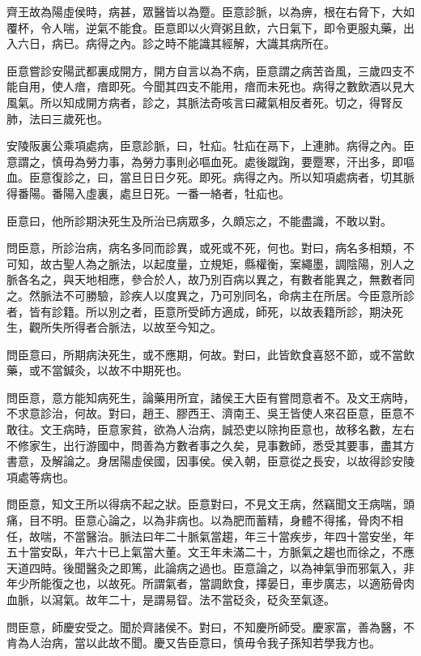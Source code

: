 齊王故為陽虛侯時，病甚，眾醫皆以為蹷。臣意診脈，以為痹，根在右脅下，大如覆杯，令人喘，逆氣不能食。臣意即以火齊粥且飲，六日氣下，即令更服丸藥，出入六日，病已。病得之內。診之時不能識其經解，大識其病所在。

臣意嘗診安陽武都裏成開方，開方自言以為不病，臣意謂之病苦沓風，三歲四支不能自用，使人瘖，瘖即死。今聞其四支不能用，瘖而未死也。病得之數飲酒以見大風氣。所以知成開方病者，診之，其脈法奇咳言曰藏氣相反者死。切之，得腎反肺，法曰三歲死也。

安陵阪裏公乘項處病，臣意診脈，曰，牡疝。牡疝在鬲下，上連肺。病得之內。臣意謂之，慎毋為勞力事，為勞力事則必嘔血死。處後蹴踘，要蹷寒，汗出多，即嘔血。臣意復診之，曰，當旦日日夕死。即死。病得之內。所以知項處病者，切其脈得番陽。番陽入虛裏，處旦日死。一番一絡者，牡疝也。

臣意曰，他所診期決死生及所治已病眾多，久頗忘之，不能盡識，不敢以對。

問臣意，所診治病，病名多同而診異，或死或不死，何也。對曰，病名多相類，不可知，故古聖人為之脈法，以起度量，立規矩，縣權衡，案繩墨，調陰陽，別人之脈各名之，與天地相應，參合於人，故乃別百病以異之，有數者能異之，無數者同之。然脈法不可勝驗，診疾人以度異之，乃可別同名，命病主在所居。今臣意所診者，皆有診籍。所以別之者，臣意所受師方適成，師死，以故表籍所診，期決死生，觀所失所得者合脈法，以故至今知之。

問臣意曰，所期病決死生，或不應期，何故。對曰，此皆飲食喜怒不節，或不當飲藥，或不當鍼灸，以故不中期死也。

問臣意，意方能知病死生，論藥用所宜，諸侯王大臣有嘗問意者不。及文王病時，不求意診治，何故。對曰，趙王、膠西王、濟南王、吳王皆使人來召臣意，臣意不敢往。文王病時，臣意家貧，欲為人治病，誠恐吏以除拘臣意也，故移名數，左右不修家生，出行游國中，問善為方數者事之久矣，見事數師，悉受其要事，盡其方書意，及解論之。身居陽虛侯國，因事侯。侯入朝，臣意從之長安，以故得診安陵項處等病也。

問臣意，知文王所以得病不起之狀。臣意對曰，不見文王病，然竊聞文王病喘，頭痛，目不明。臣意心論之，以為非病也。以為肥而蓄精，身體不得搖，骨肉不相任，故喘，不當醫治。脈法曰年二十脈氣當趨，年三十當疾步，年四十當安坐，年五十當安臥，年六十已上氣當大董。文王年未滿二十，方脈氣之趨也而徐之，不應天道四時。後聞醫灸之即篤，此論病之過也。臣意論之，以為神氣爭而邪氣入，非年少所能復之也，以故死。所謂氣者，當調飲食，擇晏日，車步廣志，以適筋骨肉血脈，以瀉氣。故年二十，是謂易眢。法不當砭灸，砭灸至氣逐。

問臣意，師慶安受之。聞於齊諸侯不。對曰，不知慶所師受。慶家富，善為醫，不肯為人治病，當以此故不聞。慶又告臣意曰，慎毋令我子孫知若學我方也。

